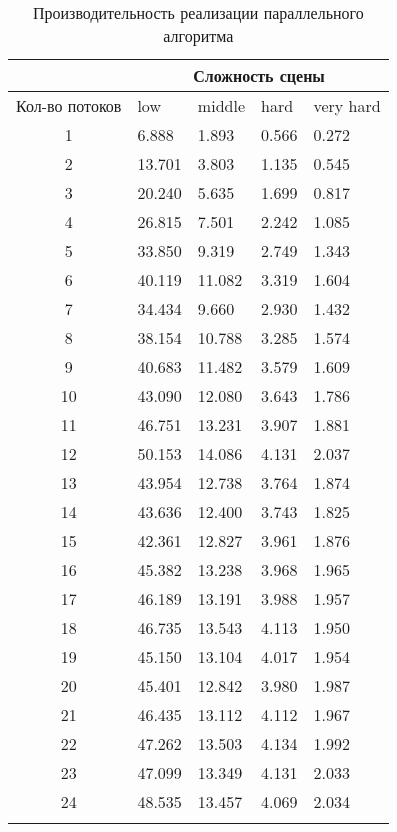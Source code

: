 \begin{center}
\begin{longtable}{|c|p{2cm}|p{2cm}|p{2cm}|p{2cm}|}
\hline & \multicolumn{4}{c|}{Сложность сцены} \\ 
\hline Кол-во потоков & low & middle & hard &  very hard\\ 
\hline 1 &  6.888 & 1.893 & 0.566 & 0.272 \\ 
\hline 2 &  13.701 & 3.803 & 1.135 & 0.545 \\ 
\hline 3 &  20.240 & 5.635 & 1.699 & 0.817 \\ 
\hline 4 &  26.815 & 7.501 & 2.242 & 1.085 \\ 
\hline 5 &  33.850 & 9.319 & 2.749 & 1.343 \\ 
\hline 6 &  40.119 & 11.082 & 3.319 & 1.604 \\ 
\hline 7 &  34.434 & 9.660 & 2.930 & 1.432 \\ 
\hline 8 &  38.154 & 10.788 & 3.285 & 1.574 \\ 
\hline 9 &  40.683 & 11.482 & 3.579 & 1.609 \\ 
\hline 10 &  43.090 & 12.080 & 3.643 & 1.786 \\ 
\hline 11 &  46.751 & 13.231 & 3.907 & 1.881 \\ 
\hline 12 &  50.153 & 14.086 & 4.131 & 2.037 \\ 
\hline 13 &  43.954 & 12.738 & 3.764 & 1.874 \\ 
\hline 14 &  43.636 & 12.400 & 3.743 & 1.825 \\ 
\hline 15 &  42.361 & 12.827 & 3.961 & 1.876 \\ 
\hline 16 &  45.382 & 13.238 & 3.968 & 1.965 \\ 
\hline 17 &  46.189 & 13.191 & 3.988 & 1.957 \\ 
\hline 18 &  46.735 & 13.543 & 4.113 & 1.950 \\ 
\hline 19 &  45.150 & 13.104 & 4.017 & 1.954 \\ 
\hline 20 &  45.401 & 12.842 & 3.980 & 1.987 \\ 
\hline 21 &  46.435 & 13.112 & 4.112 & 1.967 \\ 
\hline 22 &  47.262 & 13.503 & 4.134 & 1.992 \\ 
\hline 23 &  47.099 & 13.349 & 4.131 & 2.033 \\ 
\hline 24 &  48.535 & 13.457 & 4.069 & 2.034 \\ 
\hline
\caption{Производительность реализации параллельного алгоритма}\label{tab:perf_parallel_alg}\end{longtable}
\end{center}

